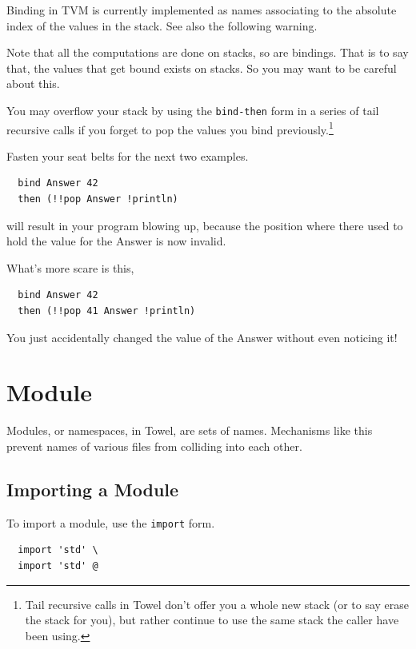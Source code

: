 \documentclass{report}
\begin{document}
\begin{mdframed}[style=detail]
  Binding in TVM is currently implemented as names associating to the absolute index of the values in the stack. See also the following warning.
\end{mdframed}

\begin{mdframed}[style=warning]
Note that all the computations are done on stacks, so are bindings. That is to say that, the values that get bound exists on stacks. So you may want to be careful about this.

You may overflow your stack by using the \texttt{bind-then} form in a series of tail recursive calls if you forget to pop the values you bind previously.\footnote{Tail recursive calls in Towel don't offer you a whole new stack (or to say erase the stack for you), but rather continue to use the same stack the caller have been using.}

Fasten your seat belts for the next two examples.

\begin{verbatim}
  bind Answer 42
  then (!!pop Answer !println)
\end{verbatim}

will result in your program blowing up, because the position where there used to hold the value for the Answer is now invalid.

What's more scare is this,

\begin{verbatim}
  bind Answer 42
  then (!!pop 41 Answer !println)
\end{verbatim}

You just accidentally changed the value of the Answer without even noticing it!
\end{mdframed}

\section{Module}

Modules, or namespaces, in Towel, are sets of names. Mechanisms like this prevent names of various files from colliding into each other.

\subsection{Importing a Module}

To import a module, use the \texttt{import} form.
\begin{mdframed}[style=example]
\begin{verbatim}
  import 'std' \
  import 'std' @
\end{verbatim}
\end{mdframed}
\end{document}
